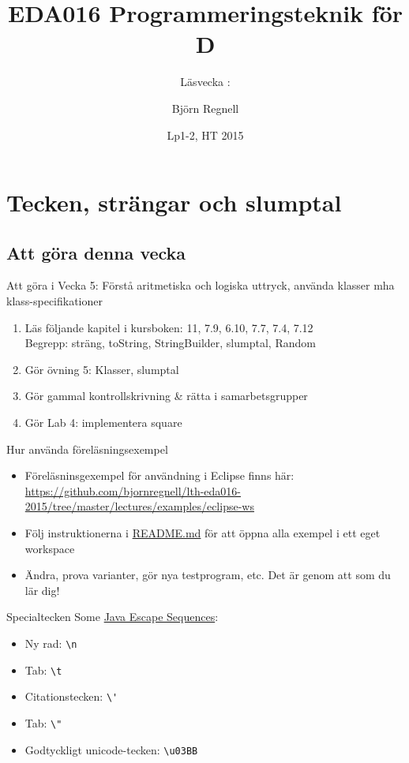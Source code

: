 \documentclass{lecturenotes}
\title[Föreläsningsanteckningar EDA016, 2015]{EDA016 Programmeringsteknik för D}
\subtitle{Läsvecka \vecka: \tema}
\author{Björn Regnell}
\institute{Datavetenskap, LTH}
\date{Lp1-2, HT 2015}
\renewcommand{\vecka}{5}
\newcommand{\tema}{Tecken, strängar och slumptal}
\begin{document}
\frame{\titlepage}
\setnextsection{\vecka}
\section[Vecka \vecka: \tema]{\tema}
\frame{\tableofcontents}


\subsection{Att göra denna vecka}
\begin{Slide}{Att göra i Vecka \vecka: Förstå aritmetiska och logiska uttryck, använda klasser mha klass-specifikationer}
\begin{enumerate}
\item Läs följande kapitel i kursboken: 11, 7.9, 6.10, 7.7, 7.4, 7.12 \\  
Begrepp: sträng, toString, StringBuilder, slumptal, Random
\item Gör övning 5: Klasser, slumptal
\item Gör gammal kontrollskrivning \& rätta i samarbetsgrupper 
\item Gör Lab 4: implementera square
\end{enumerate}
\end{Slide}

\begin{Slide}{Hur använda föreläsningsexempel}
\begin{itemize}
\item Föreläsninsgexempel för användning i Eclipse finns här: \\ {\scriptsize
  \url{https://github.com/bjornregnell/lth-eda016-2015/tree/master/lectures/examples/eclipse-ws} }
\item Följ instruktionerna i \href{https://github.com/bjornregnell/lth-eda016-2015/blob/master/lectures/examples/eclipse-ws/README.md}{README.md} för att öppna alla exempel i ett eget workspace
\item Ändra, prova varianter, gör nya testprogram, etc. Det är genom att  som du lär dig!
\end{itemize}
\end{Slide}



\begin{Slide}{Specialtecken}
Some \href{https://docs.oracle.com/javase/tutorial/java/data/characters.html}{Java Escape Sequences}:
\begin{itemize}
\item Ny rad: \verb+\n+
\item Tab: \verb+\t+
\item Citationstecken: \verb+\'+
\item Tab: \verb+\"+
\item Godtyckligt unicode-tecken:  \verb+\u03BB+ 
\end{itemize}
\end{Slide}
\end{document}
